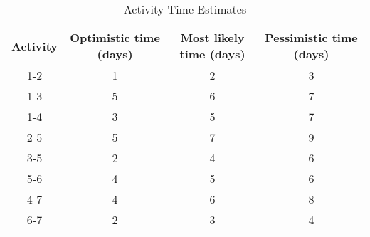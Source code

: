 \begin{table}[H]
\centering
\begin{tabular}{|c|c|c|c|}
\hline
\textbf{Activity} & \textbf{Optimistic time (days)} & \textbf{Most likely time (days)} & \textbf{Pessimistic time (days)} \\
\hline
1-2 & 1 & 2 & 3 \\
1-3 & 5 & 6 & 7 \\
1-4 & 3 & 5 & 7 \\
2-5 & 5 & 7 & 9 \\
3-5 & 2 & 4 & 6 \\
5-6 & 4 & 5 & 6 \\
4-7 & 4 & 6 & 8 \\
6-7 & 2 & 3 & 4 \\
\hline
\end{tabular}
\caption{Activity Time Estimates}
\end{table}
